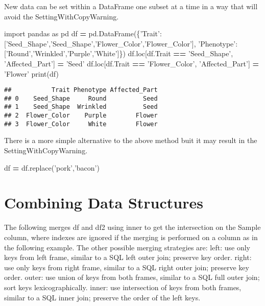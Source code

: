 \documentclass[]{book}
\newenvironment{Shaded}{\begin{snugshade}}{\end{snugshade}}
\newcommand{\StringTok}[1]{\textcolor[rgb]{0.31,0.60,0.02}{#1}}
\newcommand{\ImportTok}[1]{#1}
\newcommand{\OperatorTok}[1]{\textcolor[rgb]{0.81,0.36,0.00}{\textbf{#1}}}
\newcommand{\BuiltInTok}[1]{#1}
\newcommand{\NormalTok}[1]{#1}
\begin{document}
New data can be set within a DataFrame one subset at a time in a way
that will avoid the SettingWithCopyWarning.

\begin{Shaded}
\begin{Highlighting}[]
\ImportTok{import}\NormalTok{ pandas }\ImportTok{as}\NormalTok{ pd}
\NormalTok{df }\OperatorTok{=}\NormalTok{ pd.DataFrame(\{}\StringTok{'Trait'}\NormalTok{:[}\StringTok{'Seed_Shape'}\NormalTok{,}\StringTok{'Seed_Shape'}\NormalTok{,}\StringTok{'Flower_Color'}\NormalTok{,}\StringTok{'Flower_Color'}\NormalTok{],}
                    \StringTok{'Phenotype'}\NormalTok{:[}\StringTok{'Round'}\NormalTok{,}\StringTok{'Wrinkled'}\NormalTok{,}\StringTok{'Purple'}\NormalTok{,}\StringTok{'White'}\NormalTok{]\})}
\NormalTok{df.loc[df.Trait }\OperatorTok{==} \StringTok{'Seed_Shape'}\NormalTok{, }\StringTok{'Affected_Part'}\NormalTok{] }\OperatorTok{=} \StringTok{'Seed'}
\NormalTok{df.loc[df.Trait }\OperatorTok{==} \StringTok{'Flower_Color'}\NormalTok{, }\StringTok{'Affected_Part'}\NormalTok{] }\OperatorTok{=} \StringTok{'Flower'}
\BuiltInTok{print}\NormalTok{(df)}
\end{Highlighting}
\end{Shaded}

\begin{verbatim}
##           Trait Phenotype Affected_Part
## 0    Seed_Shape     Round          Seed
## 1    Seed_Shape  Wrinkled          Seed
## 2  Flower_Color    Purple        Flower
## 3  Flower_Color     White        Flower
\end{verbatim}

There is a more simple alternative to the above method buit it may
result in the SettingWithCopyWarning.

\begin{Shaded}
\begin{Highlighting}[]
\NormalTok{df }\OperatorTok{=}\NormalTok{ df.replace(}\StringTok{'pork'}\NormalTok{,}\StringTok{'bacon'}\NormalTok{)}
\end{Highlighting}
\end{Shaded}

\section{Combining Data Structures}\label{combining-data-structures}

The following merges df and df2 using inner to get the intersection on
the Sample column, where indexes are ignored if the merging is performed
on a column as in the following example. The other possible merging
strategies are: left: use only keys from left frame, similar to a SQL
left outer join; preserve key order. right: use only keys from right
frame, similar to a SQL right outer join; preserve key order. outer: use
union of keys from both frames, similar to a SQL full outer join; sort
keys lexicographically. inner: use intersection of keys from both
frames, similar to a SQL inner join; preserve the order of the left
keys.
\end{document}
